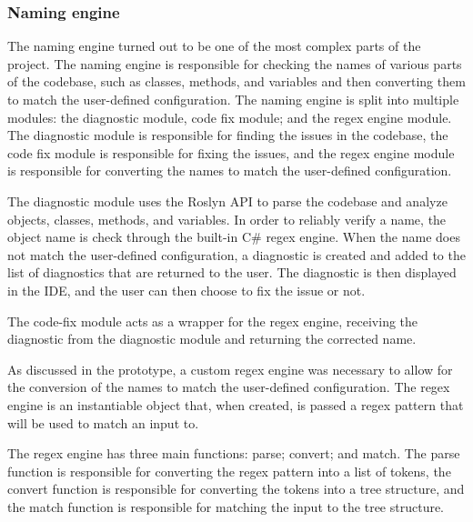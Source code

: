 \subsubsection{Naming engine}

The naming engine turned out to be one of the most complex parts of the project. The naming engine is responsible for checking the names of various parts of the codebase, such as classes, methods, and variables and then converting them to match the user-defined configuration. The naming engine is split into multiple modules: the diagnostic module, code fix module; and the regex engine module. The diagnostic module is responsible for finding the issues in the codebase, the code fix module is responsible for fixing the issues, and the regex engine module is responsible for converting the names to match the user-defined configuration.

The diagnostic module uses the Roslyn API to parse the codebase and analyze objects, classes, methods, and variables. In order to reliably verify a name, the object name is check through the built-in C\# regex engine. When the name does not match the user-defined configuration, a diagnostic is created and added to the list of diagnostics that are returned to the user. The diagnostic is then displayed in the IDE, and the user can then choose to fix the issue or not.

The code-fix module acts as a wrapper for the regex engine, receiving the diagnostic from the diagnostic module and returning the corrected name.

As discussed in the prototype, a custom regex engine was necessary to allow for the conversion of the names to match the user-defined configuration. The regex engine is an instantiable object that, when created, is passed a regex pattern that will be used to match an input to.

The regex engine has three main functions: parse; convert; and match. The parse function is responsible for converting the regex pattern into a list of tokens, the convert function is responsible for converting the tokens into a tree structure, and the match function is responsible for matching the input to the tree structure.

